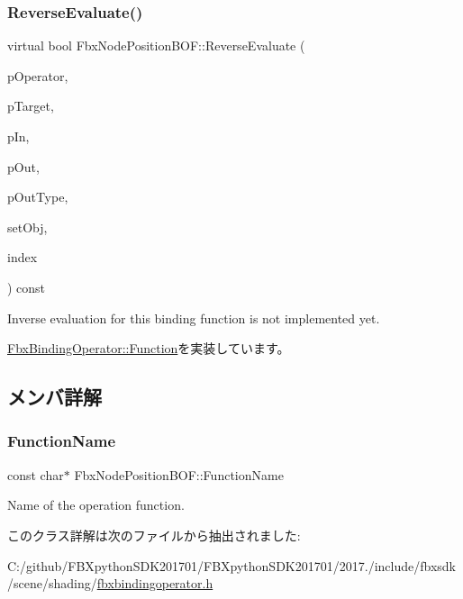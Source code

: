 \subsubsection{\texorpdfstring{Reverse\+Evaluate()}{ReverseEvaluate()}}
{\footnotesize\ttfamily virtual bool Fbx\+Node\+Position\+B\+O\+F\+::\+Reverse\+Evaluate (\begin{DoxyParamCaption}\item[{const \hyperlink{class_fbx_binding_operator}{Fbx\+Binding\+Operator} $\ast$}]{p\+Operator,  }\item[{const \hyperlink{class_fbx_object}{Fbx\+Object} $\ast$}]{p\+Target,  }\item[{const void $\ast$}]{p\+In,  }\item[{void $\ast$$\ast$}]{p\+Out,  }\item[{\hyperlink{fbxpropertytypes_8h_a73913a5ddfb20e57c6f25e9e6784bd92}{E\+Fbx\+Type} $\ast$}]{p\+Out\+Type,  }\item[{bool}]{set\+Obj,  }\item[{int}]{index }\end{DoxyParamCaption}) const\hspace{0.3cm}{\ttfamily [virtual]}}



Inverse evaluation for this binding function is not implemented yet. 



\hyperlink{class_fbx_binding_operator_1_1_function_a9bbeec993a6e453a6569e7f40a85fd52}{Fbx\+Binding\+Operator\+::\+Function}を実装しています。



\subsection{メンバ詳解}
\mbox{\label{class_fbx_node_position_b_o_f_aaa0c4610384d1dbb4e566bad44c356ee}} 
\subsubsection{\texorpdfstring{Function\+Name}{FunctionName}}
{\footnotesize\ttfamily const char$\ast$ Fbx\+Node\+Position\+B\+O\+F\+::\+Function\+Name\hspace{0.3cm}{\ttfamily [static]}}



Name of the operation function. 



このクラス詳解は次のファイルから抽出されました\+:\begin{DoxyCompactItemize}
\item 
C\+:/github/\+F\+B\+Xpython\+S\+D\+K201701/\+F\+B\+Xpython\+S\+D\+K201701/2017./include/fbxsdk/scene/shading/\hyperlink{fbxbindingoperator_8h}{fbxbindingoperator.\+h}\end{DoxyCompactItemize}
